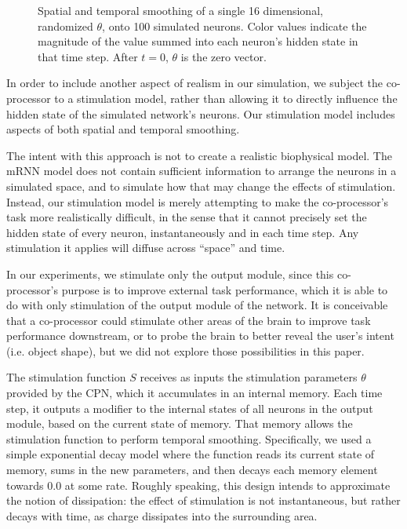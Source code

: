 \documentclass[12pt]{iopart}
\begin{document}
\begin{figure}[h]
	\caption{Spatial and temporal smoothing of a single 16 dimensional,
	         randomized $\theta$, onto 100 simulated neurons.
		 Color values indicate the magnitude of the value summed into
		 each neuron's hidden state in that time step. After $t=0$,
		 $\theta$ is the zero vector.}
	\label{fig:stim_single}
\end{figure}

In order to include another aspect of realism in our simulation, we subject
the co-processor to a stimulation model, rather than allowing it to directly
influence the hidden state of the simulated network's neurons. Our stimulation
model includes aspects of both spatial and temporal smoothing.

The intent with this approach is not to create a realistic biophysical model. The
mRNN model does not contain sufficient information to arrange the neurons in a
simulated space, and to simulate how that may change the effects of stimulation.
Instead, our stimulation model is merely attempting to make the co-processor's task
more realistically difficult, in the sense that it cannot precisely set the hidden
state of every neuron, instantaneously and in each time step. Any stimulation it
applies will diffuse across ``space'' and time.

In our experiments, we stimulate only the output module, since this co-processor's
purpose is to improve external task performance, which it is able to do with
only stimulation of the output module of the network. It is conceivable that
a co-processor could stimulate other areas of the brain to improve task performance
downstream, or to probe the brain to better reveal the user's intent (i.e. object
shape), but we did not explore those possibilities in this paper.

The stimulation function $S$ receives as inputs the stimulation parameters $\theta$
provided by the CPN, which it accumulates in an internal memory. Each time step,
it outputs a modifier to the internal states of all neurons in the output module,
based on the current state of memory. That memory allows
the stimulation function to perform temporal smoothing. Specifically, we used a
simple exponential decay model where the function reads its current state of memory,
sums in the new parameters, and then decays each memory element towards $0.0$ at some
rate. Roughly speaking, this design intends to approximate the notion of dissipation: the
effect of stimulation is not instantaneous, but rather decays with time, as charge
dissipates into the surrounding area.
\end{document}

